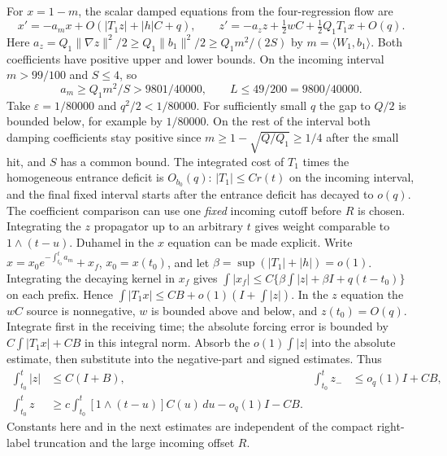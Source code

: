 \documentclass[11pt]{article}
\newcommand{\eps}{\varepsilon}
\begin{document}
For $x=1-m$, the scalar damped equations from the four-regression flow are
\[
 x'=-a_m x+O(|T_1 z|+|h|C+q),\qquad
 z'=-a_z z+\tfrac12 w C+\tfrac12 Q_1T_1 x+O(q).
\]
Here $a_z=Q_1\|\nabla z\|^2/2\ge Q_1\|b_1\|^2/2\ge Q_1m^2/(2S)$ by $m=\langle W_1,b_1\rangle$. Both coefficients have positive upper and lower bounds. On the incoming
interval $m>99/100$ and $S\le4$, so
\begin{equation}\label{an04e5rv1:damping}
 a_m\ge Q_1m^2/S>9801/40000,\qquad L\le49/200=9800/40000.
\end{equation}
Take $\eps=1/80000$ and $q^2/2<1/80000$. For sufficiently small $q$ the gap to $Q/2$ is bounded below, for example by $1/80000$. On the rest of the interval both damping coefficients stay positive since $m\ge1-\sqrt{Q/Q_1}\ge1/4$ after the small hit, and $S$ has a common bound.
The integrated cost of $T_1$ times the homogeneous entrance deficit
is $O_{b_0}(q)$: $|T_1|\le Cr(t)$ on the incoming interval, and the final
fixed interval starts after the entrance deficit has decayed to $o(q)$.
The coefficient comparison can use one \emph{fixed} incoming cutoff
before $R$ is chosen. Integrating the $z$ propagator up to an arbitrary
$t$ gives weight comparable to $1\wedge(t-u)$. Duhamel in the $x$
equation can be made explicit. Write $x=x_0 e^{-\int_{t_0}^t a_m}+x_f$, $x_0=x(t_0)$, and let $\beta=\sup(|T_1|+|h|)=o(1)$. Integrating the decaying kernel in $x_f$ gives
$\int|x_f|\le C\{\beta\int |z|+\beta I+q(t-t_0)\}$ on each prefix. Hence $\int|T_1 x|\le CB+o(1)(I+\int|z|)$. In the $z$ equation the $wC$ source is nonnegative, $w$ is bounded above and below, and $z(t_0)=O(q)$. Integrate first in the receiving time; the absolute forcing error is bounded by $C\int|T_1x|+CB$ in this integral norm. Absorb the $o(1)\int |z|$ into the absolute estimate, then substitute into the negative-part and signed estimates. Thus
\begin{align}
 \int_{t_0}^t |z|&\le C(I+B),&
 \int_{t_0}^t z_-&\le o_q(1) I+CB, \nonumber\\
 \int_{t_0}^t z&\ge c\int_{t_0}^t[1\wedge(t-u)]C(u)\,du-o_q(1)I-CB.
 \label{an04e5rv1:prefix}
\end{align}
Constants here and in the next estimates are independent of the compact
right-label truncation and the large incoming offset $R$.
\end{document}
